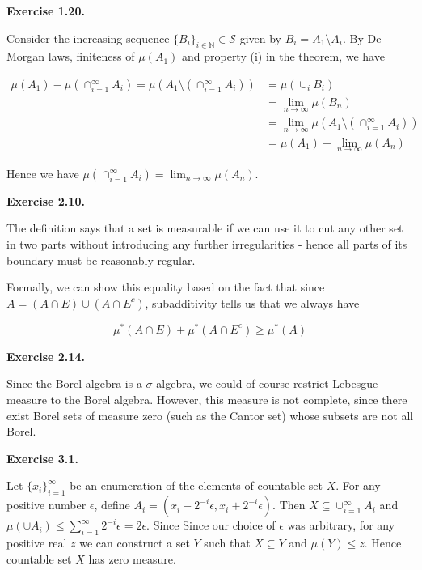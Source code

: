 \documentclass[letterpaper,12pt]{article}
\theoremstyle{definition}
\begin{document}
\begin{spacing}{1.3}{}
\begin{itemize}
\end{itemize}

\textbf{Exercise 1.20.}

Consider the increasing sequence $\{B_{i}\}_{i \in \mathbb{N}}  \in \mathcal{S}$ given by $B_{i} = A_{1} \setminus A_{i}$.  By De Morgan laws, finiteness of $\mu(A_1)$ and property (i) in the theorem, we have

\begin{align*}
\mu(A_1) - \mu(\cap_{i=1}^\infty A_i) = \mu(A_1 \setminus (\cap_{i=1}^\infty A_i))  & = \mu(\cup_{i} B_{i}) \\ & = \lim_{n\rightarrow \infty} \mu(B_n) \\ & =\lim_{n\rightarrow \infty} \mu(A_1 \setminus (\cap_{i=1}^\infty A_i)) \\ & = \mu(A_1) - \lim_{n\rightarrow \infty} \mu(A_n)
\end{align*}

Hence we have $\mu(\cap_{i=1}^\infty A_i) =  \lim_{n\rightarrow \infty} \mu(A_n) $.

\textbf{Exercise 2.10.}

The definition says that a set is measurable if we can use it to cut any other set in two parts without introducing any further irregularities - hence all parts of its boundary must be reasonably regular.

Formally, we can show this equality based on the fact that since $ A = (A \cap E) \cup (A \cap E^{c})$, subadditivity tells us that we always have 

$$\mu^{*} (A \cap E) + \mu^{*} (A \cap E^{c}) \geq \mu^{*} (A) $$ 

\textbf{Exercise 2.14.}

Since the Borel algebra is a $\sigma$-algebra, we could of course restrict Lebesgue measure to the Borel algebra. However, this measure is not complete, since there exist Borel sets of measure zero (such as the Cantor set) whose subsets are not all Borel.

\textbf{Exercise 3.1.}

Let $\{x_{i}\}_{i=1}^{\infty}$ be an enumeration of the elements of countable set $X$. For any positive number $\epsilon$, define $A_{i} = (x_{i} - 2^{-i}\epsilon, x_{i} + 2^{-i}\epsilon)$. Then $X \subseteq \cup_{i=1}^{\infty} A_{i}$ and $\mu(\cup A_i) \leq \sum_{i=1}^{\infty} 2^{-i}\epsilon = 2\epsilon$. Since Since our choice of $\epsilon$ was arbitrary, for any positive real $z$
we can construct a set $Y$ such that $X \subseteq Y$ and $\mu(Y) \leq z$. Hence countable set $X$ has zero measure. 


\end{spacing}
\end{document}
